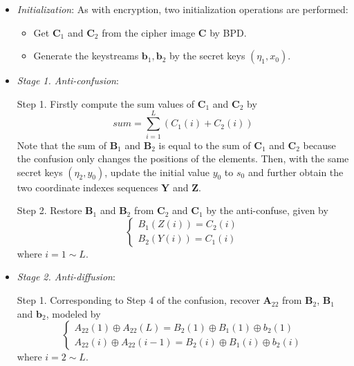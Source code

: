 \documentclass[final,3p,times]{elsarticle}
\begin{document}
\begin{itemize}
	
	\item \emph{Initialization}:
	As with encryption, two initialization operations are performed:
	\begin{itemize}
		\item Get $\bm{C}_1$ and $\bm{C}_2$ from the cipher image $\bm{C}$ by BPD. 
		
		\item Generate the keystreams $\bm{b}_1,\bm{b}_2$ by the secret keys $(\eta_1,x_0)$.
	\end{itemize}

	
	
	\item \emph{Stage 1. Anti-confusion}:
	
	Step 1. Firstly compute the sum values of $\bm{C}_1$ and $\bm{C}_2$ by
	\begin{equation}
	sum = \sum\limits_{i= 1}^{L} (C_1(i)+C_2(i))
	\label{eq:sum_C}
	\end{equation}
	Note that the sum of $\bm{B}_1$ and $\bm{B}_2$ is equal to the sum of $\bm{C}_1$ and $\bm{C}_2$ because the confusion only changes the positions of the elements.	Then, with the same secret keys $(\eta_2,y_0)$, update the initial value $y_0$ to $s_0$ and further obtain the two coordinate indexes sequences $\bm{Y}$ and $\bm{Z}$.
	
	Step 2. Restore $\bm{B}_1$ and $\bm{B}_2$ from $\bm{C}_2$ and $\bm{C}_1$ by the anti-confuse, given by
	\begin{equation}
	\left\{ \begin{array}{l}
	B_1(Z(i)) = C_2(i)\\
    B_2(Y(i)) = C_1(i)
	\end{array} \right.
	\label{eq:anti-confusion}
	\end{equation}
	where $i=1 \sim L$. 
	
	
	\item \emph{Stage 2. Anti-diffusion}:
	
	Step 1. Corresponding to Step 4 of the confusion, recover $\bm{A}_{22}$ from $\bm{B}_{2}$, $\bm{B}_{1}$ and $\bm{b}_{2}$, modeled by
	\begin{equation}
	\left\{ \begin{array}{l}
	A_{22}(1) \oplus A_{22}(L)  = B_2(1) \oplus B_{1}(1) \oplus b_{2}(1)\\
	A_{22}(i) \oplus A_{22}(i-1) = B_2(i) \oplus B_{1}(i) \oplus b_{2}(i)
	\end{array} \right.
	\label{eq:B2_to_A22}
	\end{equation}
	where $i=2 \sim L$.
	

\end{itemize}
\end{document}
